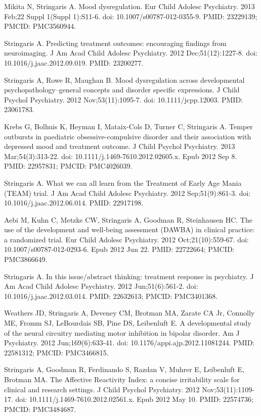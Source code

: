 \documentclass[
]{article}
\begin{document}
Mikita N, Stringaris A. Mood dysregulation. Eur Child Adolesc
Psychiatry. 2013 Feb;22 Suppl 1(Suppl 1):S11-6. doi:
10.1007/s00787-012-0355-9. PMID: 23229139; PMCID: PMC3560944.

Stringaris A. Predicting treatment outcomes: encouraging findings from
neuroimaging. J Am Acad Child Adolesc Psychiatry. 2012
Dec;51(12):1227-8. doi: 10.1016/j.jaac.2012.09.019. PMID: 23200277.

Stringaris A, Rowe R, Maughan B. Mood dysregulation across developmental
psychopathology--general concepts and disorder specific expressions. J
Child Psychol Psychiatry. 2012 Nov;53(11):1095-7. doi:
10.1111/jcpp.12003. PMID: 23061783.

Krebs G, Bolhuis K, Heyman I, Mataix-Cols D, Turner C, Stringaris A.
Temper outbursts in paediatric obsessive-compulsive disorder and their
association with depressed mood and treatment outcome. J Child Psychol
Psychiatry. 2013 Mar;54(3):313-22. doi:
10.1111/j.1469-7610.2012.02605.x. Epub 2012 Sep 8. PMID: 22957831;
PMCID: PMC4026039.

Stringaris A. What we can all learn from the Treatment of Early Age
Mania (TEAM) trial. J Am Acad Child Adolesc Psychiatry. 2012
Sep;51(9):861-3. doi: 10.1016/j.jaac.2012.06.014. PMID: 22917198.

Aebi M, Kuhn C, Metzke CW, Stringaris A, Goodman R, Steinhausen HC. The
use of the development and well-being assessment (DAWBA) in clinical
practice: a randomized trial. Eur Child Adolesc Psychiatry. 2012
Oct;21(10):559-67. doi: 10.1007/s00787-012-0293-6. Epub 2012 Jun 22.
PMID: 22722664; PMCID: PMC3866649.

Stringaris A. In this issue/abstract thinking: treatment response in
psychiatry. J Am Acad Child Adolesc Psychiatry. 2012 Jun;51(6):561-2.
doi: 10.1016/j.jaac.2012.03.014. PMID: 22632613; PMCID: PMC3401368.

Weathers JD, Stringaris A, Deveney CM, Brotman MA, Zarate CA Jr,
Connolly ME, Fromm SJ, LeBourdais SB, Pine DS, Leibenluft E. A
developmental study of the neural circuitry mediating motor inhibition
in bipolar disorder. Am J Psychiatry. 2012 Jun;169(6):633-41. doi:
10.1176/appi.ajp.2012.11081244. PMID: 22581312; PMCID: PMC3466815.

Stringaris A, Goodman R, Ferdinando S, Razdan V, Muhrer E, Leibenluft E,
Brotman MA. The Affective Reactivity Index: a concise irritability scale
for clinical and research settings. J Child Psychol Psychiatry. 2012
Nov;53(11):1109-17. doi: 10.1111/j.1469-7610.2012.02561.x. Epub 2012 May
10. PMID: 22574736; PMCID: PMC3484687.
\end{document}
